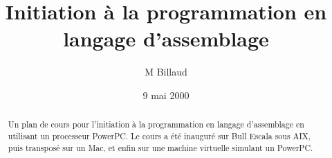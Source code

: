 \documentclass[10pt,twoside,a4paper]{article}
\title{Initiation à la programmation en langage d'assemblage}
\date{9 mai 2000}
\author{M Billaud}
\begin{document}
\maketitle

\begin{abstract}
  Un plan de cours pour l'initiation à la programmation en langage
  d'assemblage en utilisant un processeur PowerPC. Le cours a été
  inauguré sur Bull Escala sous AIX, puis transposé sur un Mac, et
  enfin sur une machine virtuelle simulant un PowerPC.
\end{abstract}


\newenvironment{tableinstr}{\begin{tabular}{p{4cm}l}}{\end{tabular}}
\newcommand{\titreinstr}[1]{\\ \multicolumn{2}{c}{\bf #1}}
\newcommand{\definstr}[2]{\texttt{#1} & $ #2 $}
\end{document}
